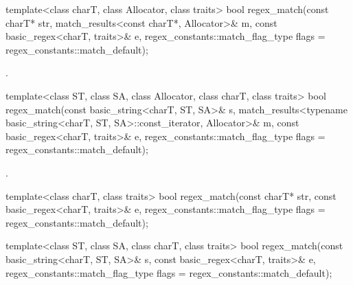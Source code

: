 %
\begin{itemdecl}
template<class charT, class Allocator, class traits>
  bool regex_match(const charT* str,
                   match_results<const charT*, Allocator>& m,
                   const basic_regex<charT, traits>& e,
                   regex_constants::match_flag_type flags = regex_constants::match_default);
\end{itemdecl}

\begin{itemdescr}
\pnum
\returns {}.
\end{itemdescr}

%
\begin{itemdecl}
template<class ST, class SA, class Allocator, class charT, class traits>
  bool regex_match(const basic_string<charT, ST, SA>& s,
                   match_results<typename basic_string<charT, ST, SA>::const_iterator,
                                 Allocator>& m,
                   const basic_regex<charT, traits>& e,
                   regex_constants::match_flag_type flags = regex_constants::match_default);
\end{itemdecl}

\begin{itemdescr}
\pnum
\returns {}.
\end{itemdescr}

%
\begin{itemdecl}
template<class charT, class traits>
  bool regex_match(const charT* str,
                   const basic_regex<charT, traits>& e,
                   regex_constants::match_flag_type flags = regex_constants::match_default);
\end{itemdecl}

\begin{itemdescr}
\pnum
\returns {}
\end{itemdescr}

%
\begin{itemdecl}
template<class ST, class SA, class charT, class traits>
  bool regex_match(const basic_string<charT, ST, SA>& s,
                   const basic_regex<charT, traits>& e,
                   regex_constants::match_flag_type flags = regex_constants::match_default);
\end{itemdecl}

